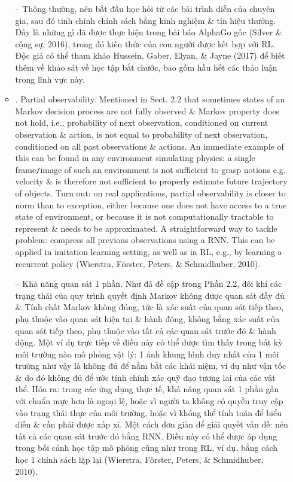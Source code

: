 \documentclass{article}
\begin{document}
\begin{itemize}
\begin{itemize}
        -- Thông thường, nên bắt đầu học hỏi từ các bài trình diễn của chuyên gia, sau đó tinh chỉnh chính sách bằng kinh nghiệm \& tín hiệu thưởng. Đây là những gì đã được thực hiện trong bài báo AlphaGo gốc (Silver \& cộng sự, 2016), trong đó kiến thức của con người được kết hợp với RL. Độc giả có thể tham khảo Hussein, Gaber, Elyan, \& Jayne (2017) để biết thêm về khảo sát về học tập bắt chước, bao gồm hầu hết các thảo luận trong lĩnh vực này.
        \item {. Partial observability.} Mentioned in Sect. 2.2 that sometimes states of an Markov decision process are not fully observed \& Markov property does not hold, i.e., probability of next observation, conditioned on current observation \& action, is not equal to probability of next observation, conditioned on all past observations \& actions. An immediate example of this can be found in any environment simulating physics: a single frame{\tt/}image of such an environment is not sufficient to grasp notions e.g. velocity \& is therefore not sufficient to properly estimate future trajectory of objects. Turn out: on real applications, partial observability is closer to norm than to exception, either because one does not have access to a true state of environment, or because it is not computationally tractable to represent \& needs to be approximated. A straightforward way to tackle problem: compress all previous observations using a RNN. This can be applied in imitation learning setting, as well as in RL, e.g., by learning a recurrent policy (Wierstra, Förster, Peters, \& Schmidhuber, 2010).

        -- {\sf Khả năng quan sát 1 phần.} Như đã đề cập trong Phần 2.2, đôi khi các trạng thái của quy trình quyết định Markov không được quan sát đầy đủ \& Tính chất Markov không đúng, tức là xác suất của quan sát tiếp theo, phụ thuộc vào quan sát hiện tại \& hành động, không bằng xác suất của quan sát tiếp theo, phụ thuộc vào tất cả các quan sát trước đó \& hành động. Một ví dụ trực tiếp về điều này có thể được tìm thấy trong bất kỳ môi trường nào mô phỏng vật lý: 1 ảnh khung hình duy nhất của 1 môi trường như vậy là không đủ để nắm bắt các khái niệm, ví dụ như vận tốc \& do đó không đủ để ước tính chính xác quỹ đạo tương lai của các vật thể. Hóa ra: trong các ứng dụng thực tế, khả năng quan sát 1 phần gần với chuẩn mực hơn là ngoại lệ, hoặc vì người ta không có quyền truy cập vào trạng thái thực của môi trường, hoặc vì không thể tính toán để biểu diễn \& cần phải được xấp xỉ. Một cách đơn giản để giải quyết vấn đề: nén tất cả các quan sát trước đó bằng RNN. Điều này có thể được áp dụng trong bối cảnh học tập mô phỏng cũng như trong RL, ví dụ, bằng cách học 1 chính sách lặp lại (Wierstra, Förster, Peters, \& Schmidhuber, 2010).


\end{itemize}
\end{itemize}
\end{document}
